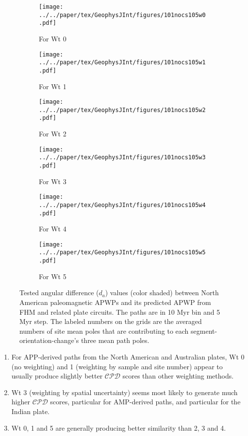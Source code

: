 \begin{figure*}
	\centering
	\begin{subfigure}{.495\textwidth}
		\texttt{[image: ../../paper/tex/GeophysJInt/figures/101nocs105w0.pdf]}
		\caption{For Wt 0}\label{fig-na-daw0}
	\end{subfigure}
	\vspace{.1em}
	\begin{subfigure}{.495\textwidth}
		\texttt{[image: ../../paper/tex/GeophysJInt/figures/101nocs105w1.pdf]}
		\caption{For Wt 1}\label{fig-na-daw1}
	\end{subfigure}
	\vspace{.1em}
	\begin{subfigure}{.495\textwidth}
		\texttt{[image: ../../paper/tex/GeophysJInt/figures/101nocs105w2.pdf]}
		\caption{For Wt 2}\label{fig-na-daw2}
	\end{subfigure}
	\vspace{.1em}
	\begin{subfigure}{.495\textwidth}
		\texttt{[image: ../../paper/tex/GeophysJInt/figures/101nocs105w3.pdf]}
		\caption{For Wt 3}\label{fig-na-daw3}
	\end{subfigure}
	\vspace{.1em}
	\begin{subfigure}{.495\textwidth}
		\texttt{[image: ../../paper/tex/GeophysJInt/figures/101nocs105w4.pdf]}
		\caption{For Wt 4}\label{fig-na-daw4}
	\end{subfigure}
	\vspace{.1em}
	\begin{subfigure}{.495\textwidth}
		\texttt{[image: ../../paper/tex/GeophysJInt/figures/101nocs105w5.pdf]}
		\caption{For Wt 5}\label{fig-na-daw5}
	\end{subfigure}
	\caption[dl of each pair of segment-oreintation-changes for North American
10/5 Myr APWPs]{Tested angular difference ($d_a$) values (color shaded) between
North American paleomagnetic APWPs and its predicted APWP from FHM and related
plate circuits. The paths are in 10 Myr bin and 5 Myr step. The labeled numbers
on the grids are the averaged numbers of site mean poles that are contributing
to each segment-orientation-change's three mean path poles.}\label{fig-nada}
\end{figure*}
%
\begin{enumerate}
  \item For APP-derived paths from the North American and Australian plates,
		Wt 0 (no weighting) and 1 (weighting by sample and site
		number) appear to usually produce slightly better $\mathcal{CPD}$ scores
		than other weighting methods.
  \item Wt 3 (weighting by spatial uncertainty) seems most likely
		to generate much higher $\mathcal{CPD}$ scores, particular for
		AMP-derived paths, and particular for the Indian plate.
  \item Wt 0, 1 and 5 are generally producing better similarity
		than 2, 3 and 4.
\end{enumerate}

